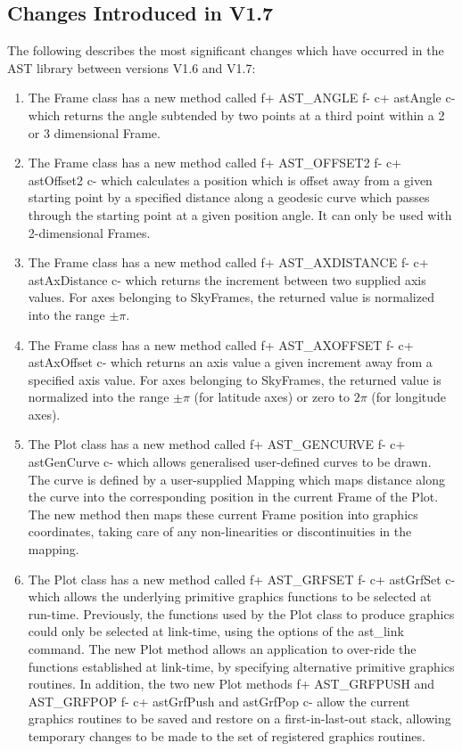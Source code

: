 \documentclass[twoside,11pt]{article}
\begin{document}
\subsection{Changes Introduced in V1.7}

The following describes the most significant changes which have
occurred in the AST library between versions V1.6 and V1.7:

\begin{enumerate}

\item The Frame class has a new method called 
f+
AST\_ANGLE
f-
c+
astAngle
c-
which returns the angle subtended by two points at a third point within a
2 or 3 dimensional Frame.

\item The Frame class has a new method called 
f+
AST\_OFFSET2
f-
c+
astOffset2
c-
which calculates a position which is offset away from a given starting
point by a specified distance along a geodesic curve which passes
through the starting point at a given position angle. It can only be used
with 2-dimensional Frames.

\item The Frame class has a new method called 
f+
AST\_AXDISTANCE
f-
c+
astAxDistance
c-
which returns the increment between two supplied axis values. For
axes belonging to SkyFrames, the returned value is normalized into
the range $\pm\pi$.

\item The Frame class has a new method called 
f+
AST\_AXOFFSET
f-
c+
astAxOffset
c-
which returns an axis value a given increment away from a specified axis
value. For axes belonging to SkyFrames, the returned value is normalized into
the range $\pm\pi$ (for latitude axes) or zero to $2\pi$ (for longitude
axes).

\item The Plot class has a new method called 
f+
AST\_GENCURVE
f-
c+
astGenCurve
c-
which allows generalised user-defined curves to be drawn. The curve is
defined by a user-supplied Mapping which maps distance along the curve
into the corresponding position in the current Frame of the Plot. The new
method then maps these current Frame position into graphics coordinates,
taking care of any non-linearities or discontinuities in the mapping.

\item The Plot class has a new method called 
f+
AST\_GRFSET 
f-
c+
astGrfSet 
c-
which allows the underlying primitive graphics functions to be selected
at run-time. Previously, the functions used by the Plot class to produce
graphics could only be selected at link-time, using the options of the
ast\_link command. The new Plot method allows an application to over-ride
the functions established at link-time, by specifying alternative
primitive graphics routines. In addition, the two new Plot methods
f+
AST\_GRFPUSH and AST\_GRFPOP
f-
c+
astGrfPush and astGrfPop
c-
allow the current graphics routines to be saved and restore on a
first-in-last-out stack, allowing temporary changes to be made to the set
of registered graphics routines.


\end{enumerate}
\end{document}
